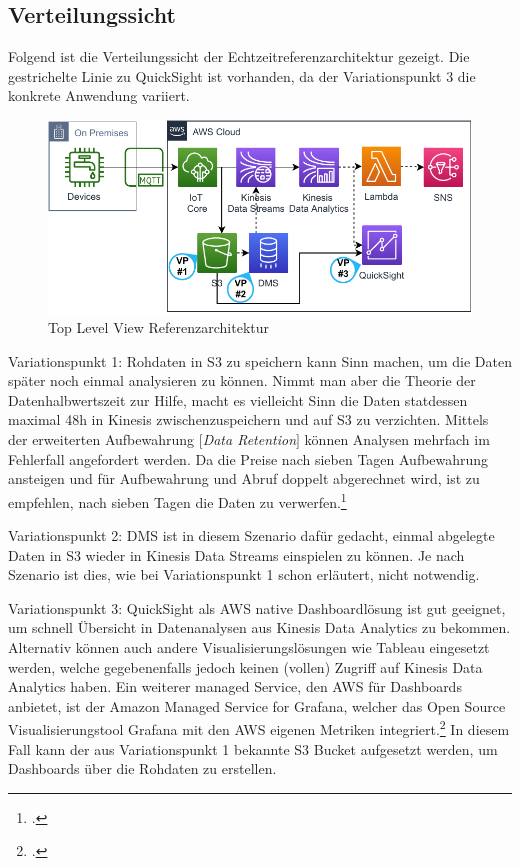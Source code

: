 \subsection{Verteilungssicht}
Folgend ist die Verteilungssicht der Echtzeitreferenzarchitektur gezeigt. Die gestrichelte Linie zu QuickSight ist vorhanden, da der Variationspunkt 3 die konkrete Anwendung variiert.
\begin{figure}[H]
\centering
\includegraphics[width=\textwidth]{graphics/Echtzeit-RA-Overview.pdf}
\caption{Top Level View Referenzarchitektur}
\label{abb:TopLevelEchtzeitRA}
\end{figure}
Variationspunkt 1: Rohdaten in \ac{S3} zu speichern kann Sinn machen, um die Daten später noch einmal analysieren zu können. Nimmt man aber die Theorie der Datenhalbwertszeit zur Hilfe, macht es vielleicht Sinn die Daten statdessen maximal 48h in Kinesis zwischenzuspeichern und auf \ac{S3} zu verzichten. Mittels der erweiterten Aufbewahrung $\lbrack$\textit{Data Retention}$\rbrack$ können Analysen mehrfach im Fehlerfall angefordert werden. Da die Preise nach sieben Tagen Aufbewahrung ansteigen und für Aufbewahrung und Abruf doppelt abgerechnet wird, ist zu empfehlen, nach sieben Tagen die Daten zu verwerfen.\footcite[Vgl.][]{AmazonWebServicesInc..o.J.l}

Variationspunkt 2: \ac{DMS} ist in diesem Szenario dafür gedacht, einmal abgelegte Daten in S3 wieder in Kinesis Data Streams einspielen zu können. Je nach Szenario ist dies, wie bei Variationspunkt 1 schon erläutert, nicht notwendig.

Variationspunkt 3: QuickSight als \ac{AWS} native Dashboardlösung ist gut geeignet, um schnell Übersicht in Datenanalysen aus Kinesis Data Analytics zu bekommen. Alternativ können auch andere Visualisierungslösungen wie Tableau eingesetzt werden, welche gegebenenfalls jedoch keinen (vollen) Zugriff auf Kinesis Data Analytics haben. Ein weiterer managed Service, den \ac{AWS} für Dashboards anbietet, ist der Amazon Managed Service for Grafana, welcher das Open Source Visualisierungstool Grafana mit den \ac{AWS} eigenen Metriken integriert.\footcite[Vgl.][]{Dutt.2020} In diesem Fall kann der aus Variationspunkt 1 bekannte \ac{S3} Bucket aufgesetzt werden, um Dashboards über die Rohdaten zu erstellen. 

